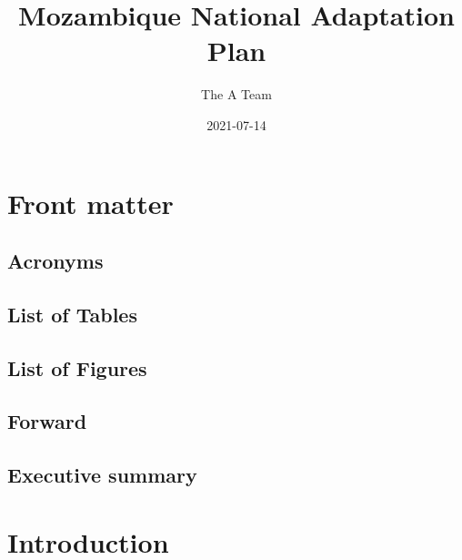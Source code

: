 \documentclass[
]{book}
\title{Mozambique National Adaptation Plan}
\author{The A Team}
\date{2021-07-14}
\begin{document}
\maketitle

{
\setcounter{tocdepth}{1}
\tableofcontents
}
\hypertarget{front-matter}{%
\chapter{Front matter}\label{front-matter}}

\hypertarget{acronyms}{%
\section{Acronyms}\label{acronyms}}

\hypertarget{list-of-tables}{%
\section{List of Tables}\label{list-of-tables}}

\hypertarget{list-of-figures}{%
\section{List of Figures}\label{list-of-figures}}

\hypertarget{forward}{%
\section{Forward}\label{forward}}

\hypertarget{executive-summary}{%
\section{Executive summary}\label{executive-summary}}

\hypertarget{introduction}{%
\chapter{Introduction}\label{introduction}}
\end{document}
